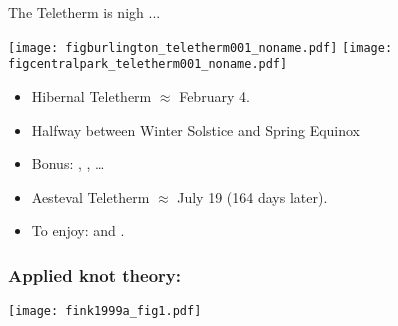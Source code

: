 \begin{frame}

  \begin{block}{The Teletherm is nigh ... }
    \begin{center}
    \texttt{[image: figburlington\_teletherm001\_noname.pdf]}
    \texttt{[image: figcentralpark\_teletherm001\_noname.pdf]}
    \end{center}
    \begin{itemize}
    \item 
      Hibernal Teletherm $\approx$ February 4.
    \item 
      Halfway between Winter Solstice and Spring Equinox
    \item 
      Bonus: , 
      , \ldots
    \item 
      Aesteval Teletherm $\approx$ July 19 (164 days later).
    \item
      To enjoy: 
      and 
      .
    \end{itemize}
  \end{block}

\end{frame}






\begin{frame}
  \frametitle{Applied knot theory:}

  \smallskip


  \smallskip

  \begin{center}
    \texttt{[image: fink1999a\_fig1.pdf]}
  \end{center}

\end{frame}

